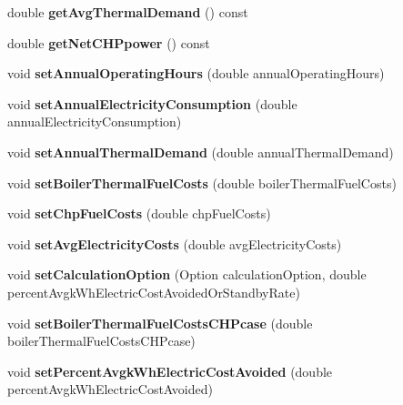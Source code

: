 \begin{DoxyCompactItemize}
double {\bfseries get\+Avg\+Thermal\+Demand} () const
\item 
\mbox{\label{class_c_h_p_a317f3df613b61f401bc5c4b69fddd0cf}} 
double {\bfseries get\+Net\+C\+H\+Ppower} () const
\item 
\mbox{\label{class_c_h_p_a1b9d3ba01f7e243bcde31bd5fdff9e0a}} 
void {\bfseries set\+Annual\+Operating\+Hours} (double annual\+Operating\+Hours)
\item 
\mbox{\label{class_c_h_p_a306aa3de555bb7dbd79e7aeb1658713e}} 
void {\bfseries set\+Annual\+Electricity\+Consumption} (double annual\+Electricity\+Consumption)
\item 
\mbox{\label{class_c_h_p_aa7abaae6cf4d62059eff750498d70076}} 
void {\bfseries set\+Annual\+Thermal\+Demand} (double annual\+Thermal\+Demand)
\item 
\mbox{\label{class_c_h_p_a13c93cd6b6bba4d52b2f8fd10638724e}} 
void {\bfseries set\+Boiler\+Thermal\+Fuel\+Costs} (double boiler\+Thermal\+Fuel\+Costs)
\item 
\mbox{\label{class_c_h_p_a419c9eaf0ad6009bb3dd753e4b1dd63b}} 
void {\bfseries set\+Chp\+Fuel\+Costs} (double chp\+Fuel\+Costs)
\item 
\mbox{\label{class_c_h_p_ad953f7558bf3a38816e29d9ffaf6273c}} 
void {\bfseries set\+Avg\+Electricity\+Costs} (double avg\+Electricity\+Costs)
\item 
\mbox{\label{class_c_h_p_abfa71c23fa4b58c03c3337b57ba0d56d}} 
void {\bfseries set\+Calculation\+Option} (Option calculation\+Option, double percent\+Avgk\+Wh\+Electric\+Cost\+Avoided\+Or\+Standby\+Rate)
\item 
\mbox{\label{class_c_h_p_a319f1e915035b2dface2dbad67c65017}} 
void {\bfseries set\+Boiler\+Thermal\+Fuel\+Costs\+C\+H\+Pcase} (double boiler\+Thermal\+Fuel\+Costs\+C\+H\+Pcase)
\item 
\mbox{\label{class_c_h_p_a002b9e405c3a1777b306430cd1bbbec3}} 
void {\bfseries set\+Percent\+Avgk\+Wh\+Electric\+Cost\+Avoided} (double percent\+Avgk\+Wh\+Electric\+Cost\+Avoided)

\end{DoxyCompactItemize}
